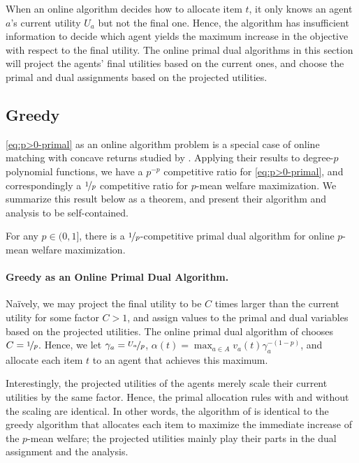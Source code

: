 \documentclass[11pt,letterpaper]{article}
\newcommand{\utility}{U}
\begin{document}
When an online algorithm decides how to allocate item $t$, it only knows an agent $a$'s current utility $\utility_a$ but not the final one.
Hence, the algorithm has insufficient information to decide which agent yields the maximum increase in the objective with respect to the final utility.
The online primal dual algorithms in this section will project the agents' final utilities based on the current ones, and choose the primal and dual assignments based on the projected utilities.

\subsection{Greedy}

\ref{eq:p>0-primal} as an online algorithm problem is a special case of online matching with concave returns studied by \citet{DevanurJ:STOC:2012}.
Applying their results to degree-$p$ polynomial functions, we have a $p^{-p}$ competitive ratio for \ref{eq:p>0-primal}, and correspondingly a $\nicefrac{1}{p}$ competitive ratio for $p$-mean welfare maximization.
We summarize this result below as a theorem, and present their algorithm and analysis to be self-contained.
         
\begin{theorem}
	\label{thm:p>0-1/p}
	For any $p\in (0,1]$, there is a $\nicefrac{1}{p}$-competitive primal dual algorithm for online $p$-mean welfare maximization.
\end{theorem}





\paragraph{Greedy as an Online Primal Dual Algorithm.}
Na\"ively, we may project the final utility to be $C$ times larger than the current utility for some factor $C > 1$, and assign values to the primal and dual variables based on the projected utilities.
The online primal dual algorithm of \citet{DevanurJ:STOC:2012} chooses $C = \nicefrac{1}{p}$.
Hence, we let $\gamma_a = \nicefrac{\utility_a}{p}$, $\alpha(t) = \max_{a \in A} v_a(t) \gamma_a^{-(1-p)}$, and allocate each item $t$ to an agent that achieves this maximum.


Interestingly, the projected utilities of the agents merely scale their current utilities by the same factor.
Hence, the primal allocation rules with and without the scaling are identical.
In other words, the algorithm of \citet{DevanurJ:STOC:2012} is identical to the greedy algorithm that allocates each item to maximize the immediate increase of the $p$-mean welfare;
the projected utilities mainly play their parts in the dual assignment and the analysis.
\end{document}
